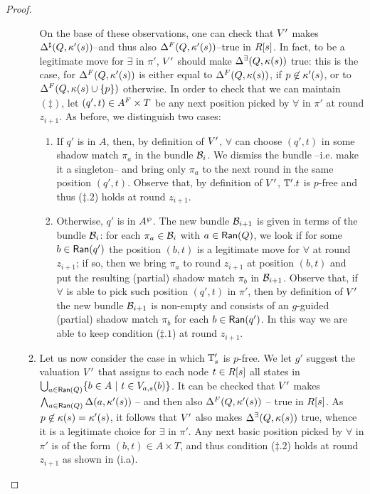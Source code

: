 \begin{proof}
\begin{enumerate}[label = (\Alph*), ref = \Alph*]
\begin{enumerate}[label = (\roman*), ref = \roman*]
       On the base of these observations, one can check that $V'$ makes $\Delta^{\sharp}(Q,\kappa'(s))$--and thus also $\Delta^{F}(Q,\kappa'(s))$--true in $R[s]$. In fact, to be a legitimate move for $\exists$ in $\pi'$, $V'$ should make $\Delta^\exists(Q,\kappa(s))$ true: this is the case, for $\Delta^{F}(Q,\kappa'(s))$ is either equal to $\Delta^{F}(Q,\kappa(s))$, if $p \not\in \kappa'(s)$, or to $\Delta^{F}(Q,\kappa(s)\cup\{p\})$ otherwise. In order to check that we can maintain $(\ddag)$, let $(q',t) \in A^{F} \times T$ be any next position picked by $\forall$ in $\pi'$ at round $z_{i+1}$. As before, we distinguish two cases:
       \begin{enumerate}[label = (\alph*), ref = \alph*]
         \item If $q'$ is in $A$, then, by definition of $V'$, $\forall$ can choose $(q',t)$ in some shadow match $\pi_a$ in the bundle $\mathcal{B}_i$. We dismiss the bundle --i.e. make it a singleton-- and bring only $\pi_a$ to the next round in the same position $(q',t)$. Observe that, by definition of $V'$, $\mathbb{T}'.t$ is $p$-free and thus ($\ddag.2$) holds at round $z_{i+1}$. \label{point:ddag2CardfromMacro}
         \item Otherwise, $q'$ is in $A^{\wp}$. The new bundle $\mathcal{B}_{i+1}$ is given in terms of the bundle $\mathcal{B}_i$: for each $\pi_a \in \mathcal{B}_i$ with $a\in \mathsf{Ran}(Q)$, we look if for some $b \in \mathsf{Ran}(q')$ the position $(b,t)$ is a legitimate move for $\forall$ at round $z_{i+1}$; if so, then we bring $\pi_a$ to round $z_{i+1}$ at position $(b,t)$ and put the resulting (partial) shadow match $\pi_b$ in $\mathcal{B}_{i+1}$. Observe that, if $\forall$ is able to pick such position $(q',t)$ in $\pi'$, then by definition of $V'$ the new bundle $\mathcal{B}_{i+1}$ is non-empty and consists of an $g$-guided (partial) shadow match $\pi_b$ for each $b \in \mathsf{Ran}(q')$. In this way we are able to keep condition ($\ddag.1$) at round $z_{i+1}$.
       \end{enumerate}
    \item Let us now consider the case in which $\mathbb{T}'_s$ is $p$-free. We let $g'$ suggest the valuation $V'$ that assigns to each node $t \in R[s]$ all states in $\bigcup_{a \in \Ran(Q)}\{b \in A\ |\ t \in \val_{a,s}(b)\}$. It can be checked that $V'$ makes $\bigwedge_{a \in \mathsf{Ran}(Q)} \Delta(a,\kappa'(s))$ -- and then also $\Delta^{F}(Q,\kappa'(s))$ -- true in $R[s]$. As $p \not\in \kappa(s)=\kappa'(s)$, it follows that $V'$ also makes $\Delta^\exists(Q,\kappa(s))$ true, whence it is a legitimate choice for $\exists$ in $\pi'$. Any next basic position picked by $\forall$ in $\pi'$ is of the form $(b,t) \in A \times T$, and thus condition ($\ddag.2$) holds at round $z_{i+1}$ as shown in (i.a). %

\end{enumerate}
\end{enumerate}
\end{proof}
